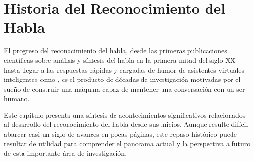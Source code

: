 \chapter{Historia del Reconocimiento del Habla}
\label{sec:antecedentes}

El progreso del reconocimiento del habla, desde las primeras publicaciones cient\'{i}ficas sobre
an\'{a}lisis y s\'{i}ntesis del habla en la primera mitad del siglo XX hasta llegar a las respuestas 
r\'{a}pidas y cargadas de humor de asistentes virtuales inteligentes como , es el producto
de d\'{e}cadas de investigaci\'{o}n motivadas por el sue\~{n}o de construir una m\'{a}quina capaz de
mantener una conversaci\'{o}n con un ser humano.

Este cap\'{i}tulo presenta una s\'{i}ntesis de acontecimientos significativos relacionados al
desarrollo del reconocimiento del habla desde sus inicios. Aunque resulte dif\'{i}cil abarcar casi un siglo
de avances en pocas p\'{a}ginas, este repaso hist\'{o}rico puede resultar de utilidad para comprender el
panorama actual y la perspectiva a futuro de esta importante \'{a}rea de investigaci\'{o}n.







